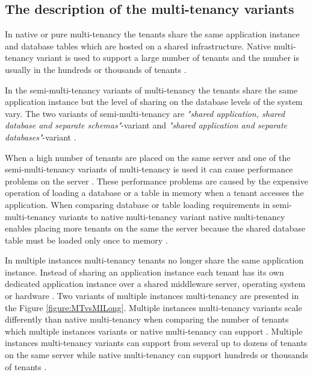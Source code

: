 \documentclass[conference]{sasmoota2017}
\begin{document}
\subsection{The description of the multi-tenancy variants}

In native or pure multi-tenancy \cite{Kabbedijk2015:Defining, Guo:2007:FrameworkForNative} the tenants share the same application instance and database tables which are hosted on a shared infrastructure. Native multi-tenancy variant is used to support a large number of tenants and the number is usually in the hundreds or thousands of tenants \cite{Guo:2007:FrameworkForNative}. 

In the semi-multi-tenancy variants of multi-tenancy \cite{Chong:2006:MultiTenantDataArchitecture, Bezemer:2010:MaintenanceDream} the tenants share the same application instance but the level of sharing on the database levels of the system vary. The two variants of semi-multi-tenancy are \textit{"shared application, shared database and separate schemas"}-variant and \textit{"shared application and separate databases"}-variant \cite{Chong:2006:MultiTenantDataArchitecture}. 

When a high number of tenants are placed on the same server and one of the semi-multi-tenancy variants of multi-tenancy is used it can cause performance problems on the server \cite{Bezemer:2010:MaintenanceDream}. These performance problems are caused by the expensive operation of loading a database or a table in memory when a tenant accesses the application. When comparing database or table loading requirements in semi-multi-tenancy variants to native multi-tenancy variant native multi-tenancy enables placing more tenants on the same the server because the shared database table must be loaded only once to memory \cite{Bezemer:2010:MaintenanceDream}.

In multiple instances multi-tenancy \cite{Guo:2007:FrameworkForNative} tenants no longer share the same application instance. Instead of sharing an application instance each tenant has its own dedicated application instance over a shared middleware server, operating system or hardware \cite{Guo:2007:FrameworkForNative}. Two variants of multiple instances multi-tenancy are presented in the Figure \ref{figure:MTvsMILong}. Multiple instances multi-tenancy variants scale differently than native multi-tenancy when comparing the number of tenants which multiple instances variants or native multi-tenancy can support \cite{Guo:2007:FrameworkForNative}. Multiple instances multi-tenancy variants can support from several up to dozens of tenants on the same server while native multi-tenancy can support hundreds or thousands of tenants \cite{Guo:2007:FrameworkForNative}.
\end{document}
